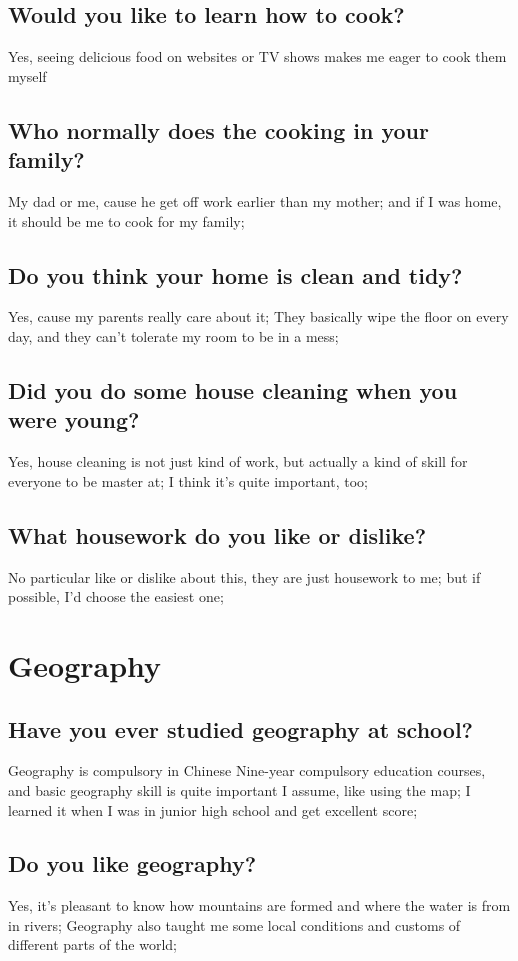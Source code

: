 \documentclass[conference]{IEEEtran}
\begin{document}
\subsection{Would you like to learn how to cook?}
Yes, seeing delicious food on websites or TV shows makes me eager to cook them myself
\subsection{Who normally does the cooking in your family?}
My dad or me, cause he get off work earlier than my mother;
and if I was home, it should be me to cook for my family;
\subsection{Do you think your home is clean and tidy?}
Yes, cause my parents really care about it;
They basically wipe the floor on every day, and they can't tolerate my room to be
in a mess;
\subsection{Did you do some house cleaning when you were young?}
Yes, house cleaning is not just kind of work, but actually a kind of skill
for everyone to be master at; I think it's quite important, too; 
\subsection{What housework do you like or dislike?}
No particular like or dislike about this, they are just housework to me;
but if possible, I'd choose the easiest one;

\section{Geography}
\subsection{Have you ever studied geography at school?}
Geography is compulsory in Chinese Nine-year compulsory education courses,
and basic geography skill is quite important I assume, like using the map;
I learned it when I was in junior high school and get excellent score;
\subsection{Do you like geography?}
Yes, it's pleasant to know how mountains are formed and where the water is from
in rivers;
Geography also taught me some local conditions and customs of different parts of
the world;
\end{document}
